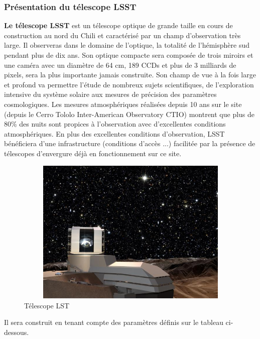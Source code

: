 \subsubsection{Présentation du télescope LSST}
\textbf{Le télescope LSST} est un télescope optique de grande taille en cours de construction au nord du Chili et caractérisé par un champ d’observation très large. Il observeras dans le domaine de l'optique, la totalité de l'hémisphère sud pendant plus de dix ans.
Son optique compacte sera composée de trois miroirs et une caméra avec un diamètre de 64 cm, 189 CCDs et plus de 3 milliards de pixels, sera la plus importante jamais construite. Son champ de vue à la fois large et profond va permettre l'étude de nombreux sujets scientifiques, de l'exploration intensive du système solaire aux mesures de précision des paramètres cosmologiques. 
Les mesures atmosphériques réalisées depuis 10 ans sur le site (depuis le Cerro Tololo Inter-American Observatory CTIO) montrent que plus de 80\% des nuits sont propices à l'observation avec d'excellentes conditions atmosphériques.
En plus des excellentes conditions d'observation, LSST bénéficiera d'une infrastructure (conditions d'accès ...) facilitée par la présence de télescopes d'envergure déjà en fonctionnement sur ce site. 
\newline
\newline
\begin{figure}[!h]
    \centering
    \includegraphics[width=12cm,height=7cm]{report/figures/LSST.jpg}
    \caption{Télescope LST}
    \label{fig:modeling_shema}
\end{figure}
\newline Il sera construit en tenant compte des paramètres définis sur le tableau ci-dessous.
\newline
